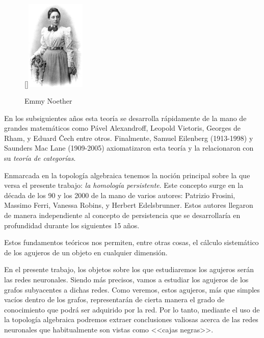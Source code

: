 \documentclass[12pt, a4paper, twoside]{book}
\numberwithin{equation}{section}
\theoremstyle{definition}
\theoremstyle{remark}
\theoremstyle{plain}
\begin{document}
	\begin{figure}
	  \begin{center}
		  \raisebox{16pt}[\dimexpr{}\baselineskip\relax]{\includegraphics[width=0.25\textwidth]{Images/315px-Noether.jpg}}
	  \vspace*{-9mm}
	  \caption*{Emmy Noether}
	  \end{center}
	\end{figure}

	En los subsiguientes años esta teoría se desarrolla rápidamente de la 
	mano de grandes matemáticos como Pável Alexandroff, Leopold Vietoris, 
	Georges de Rham, y Eduard \v{C}ech entre otros. Finalmente, Samuel 
	Eilenberg (1913-1998) y 
	Saunders Mac Lane (1909-2005) axiomatizaron esta teoría y la 
	relacionaron con su \emph{teoría de categorías}.

	Enmarcada en la topología algebraica tenemos la noción principal 
	sobre la que versa el presente trabajo: \emph{la homología 
	persistente}. Este concepto surge en la década de los 90 y los 2000 
	de la mano de varios autores: Patrizio Frosini, Massimo Ferri, 
	Vanessa Robins, y Herbert Edelsbrunner. Estos autores llegaron de 
	manera independiente al concepto de persistencia que se desarrollaría 
	en profundidad durante los siguientes 15 años. 

	Estos fundamentos teóricos nos permiten, entre otras cosas, el 
	cálculo sistemático de los agujeros de un objeto en cualquier 
	dimensión. 

	En el presente trabajo, los objetos sobre los que estudiaremos los
	agujeros serán las redes neuronales. Siendo más precisos, vamos a 
	estudiar los agujeros de los grafos subyacentes a dichas redes.
	Como veremos, estos agujeros, más que simples 
	vacíos dentro de los grafos, representarán de cierta manera el grado 
	de conocimiento que podrá ser adquirido por la red. Por lo tanto, 
	mediante el uso de 
	la topología algebraica podremos extraer conclusiones valiosas acerca 
	de las redes neuronales que habitualmente son vistas como <<cajas 
	negras>>.
\end{document}
